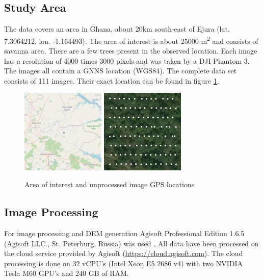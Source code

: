 \documentclass{isprs} %
\begin{document}
\subsection{Study Area}\label{sec:Study Area}
The data covers an area in Ghana, about 20km south-east of Ejura (lat. 7.3064212, lon. -1.164493). 
The area of interest is about 25000 m\textsuperscript{2} and consists of savanna area.
There are a few trees present in the observed location.
Each image has a resolution of 4000 times 3000 pixels and was taken by a DJI Phantom 3.
The images all contain a GNNS location (WGS84). 
The complete data set consists of 111 images.
Their exact location can be found in figure \ref{fig:areaofinterest}.
\begin{figure}[h]
    \centering
    \includegraphics[width=4cm]{locationwide.png}
    \includegraphics[width=4cm]{imgloc.png}
    \caption{Area of interest and unprocessed image GPS locations}
    \label{fig:areaofinterest}
\end{figure}


\subsection{Image Processing}
For image processing and DEM generation Agisoft Professional Edition 1.6.5 (Agisoft LLC., St. Peterburg, Russia) was used \citep{AgisoftMetashape}.
All data have been processed on the cloud service provided by Agisoft (\url{https://cloud.agisoft.com}).
The cloud processing is done on 32 vCPU's (Intel Xeon E5 2686 v4) with two NVIDIA Tesla M60 GPU's and 240 GB of RAM.
\end{document}

